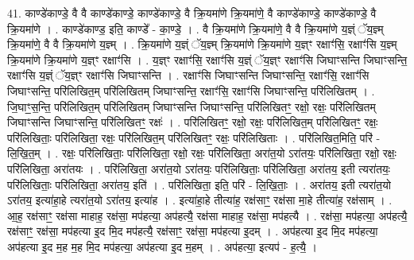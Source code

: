 \documentclass[17pt]{extarticle}
\begin{document}
41. काण्डे॑काण्डे॒ वै वै काण्डे॑काण्डे॒ काण्डे॑काण्डे॒ वै क्रि॒यमा॑णे क्रि॒यमा॑णे॒ वै काण्डे॑काण्डे॒ काण्डे॑काण्डे॒ वै क्रि॒यमा॑णे । . काण्डे॑काण्ड॒ इति॒ काण्डे᳚ - का॒ण्डे॒ । . वै क्रि॒यमा॑णे क्रि॒यमा॑णे॒ वै वै क्रि॒यमा॑णे य॒ज्ञ्ं ॅय॒ज्ञ्म् क्रि॒यमा॑णे॒ वै वै क्रि॒यमा॑णे य॒ज्ञ्म् । . क्रि॒यमा॑णे य॒ज्ञ्ं ॅय॒ज्ञ्म् क्रि॒यमा॑णे क्रि॒यमा॑णे य॒ज्ञ्ꣳ रक्षाꣳ॑सि॒ रक्षाꣳ॑सि य॒ज्ञ्म् क्रि॒यमा॑णे क्रि॒यमा॑णे य॒ज्ञ्ꣳ रक्षाꣳ॑सि । . य॒ज्ञ्ꣳ रक्षाꣳ॑सि॒ रक्षाꣳ॑सि य॒ज्ञ्ं ॅय॒ज्ञ्ꣳ रक्षाꣳ॑सि जिघाꣳसन्ति जिघाꣳसन्ति॒ रक्षाꣳ॑सि य॒ज्ञ्ं ॅय॒ज्ञ्ꣳ रक्षाꣳ॑सि जिघाꣳसन्ति । . रक्षाꣳ॑सि जिघाꣳसन्ति जिघाꣳसन्ति॒ रक्षाꣳ॑सि॒ रक्षाꣳ॑सि जिघाꣳसन्ति॒ परि॑लिखित॒म् परि॑लिखितम् जिघाꣳसन्ति॒ रक्षाꣳ॑सि॒ रक्षाꣳ॑सि जिघाꣳसन्ति॒ परि॑लिखितम् । . जि॒घाꣳ॒॒स॒न्ति॒ परि॑लिखित॒म् परि॑लिखितम् जिघाꣳसन्ति जिघाꣳसन्ति॒ परि॑लिखितꣳ॒॒ रक्षो॒ रक्षः॒ परि॑लिखितम् जिघाꣳसन्ति जिघाꣳसन्ति॒ परि॑लिखितꣳ॒॒ रक्षः॑ । . परि॑लिखितꣳ॒॒ रक्षो॒ रक्षः॒ परि॑लिखित॒म् परि॑लिखितꣳ॒॒ रक्षः॒ परि॑लिखिताः॒ परि॑लिखिता॒ रक्षः॒ परि॑लिखित॒म् परि॑लिखितꣳ॒॒ रक्षः॒ परि॑लिखिताः । . परि॑लिखित॒मिति॒ परि॑ - लि॒खि॒त॒म् । . रक्षः॒ परि॑लिखिताः॒ परि॑लिखिता॒ रक्षो॒ रक्षः॒ परि॑लिखिता॒ अरा॑त॒यो ऽरा॑तयः॒ परि॑लिखिता॒ रक्षो॒ रक्षः॒ परि॑लिखिता॒ अरा॑तयः । . परि॑लिखिता॒ अरा॑त॒यो ऽरा॑तयः॒ परि॑लिखिताः॒ परि॑लिखिता॒ अरा॑तय॒ इती त्यरा॑तयः॒ परि॑लिखिताः॒ परि॑लिखिता॒ अरा॑तय॒ इति॑ । . परि॑लिखिता॒ इति॒ परि॑ - लि॒खि॒ताः॒ । . अरा॑तय॒ इती त्यरा॑त॒यो ऽरा॑तय॒ इत्या॑हा॒हे त्यरा॑त॒यो ऽरा॑तय॒ इत्या॑ह । . इत्या॑हा॒हे तीत्या॑ह॒ रक्ष॑साꣳ॒॒ रक्ष॑सा मा॒हे तीत्या॑ह॒ रक्ष॑साम् । . आ॒ह॒ रक्ष॑साꣳ॒॒ रक्ष॑सा माहाह॒ रक्ष॑सा॒ मप॑हत्या॒ अप॑हत्यै॒ रक्ष॑सा माहाह॒ रक्ष॑सा॒ मप॑हत्यै । . रक्ष॑सा॒ मप॑हत्या॒ अप॑हत्यै॒ रक्ष॑साꣳ॒॒ रक्ष॑सा॒ मप॑हत्या इ॒द मि॒द मप॑हत्यै॒ रक्ष॑साꣳ॒॒ रक्ष॑सा॒ मप॑हत्या इ॒दम् । . अप॑हत्या इ॒द मि॒द मप॑हत्या॒ अप॑हत्या इ॒द म॒ह म॒ह मि॒द मप॑हत्या॒ अप॑हत्या इ॒द म॒हम् । . अप॑हत्या॒ इत्यप॑ - ह॒त्यै॒ । \newline
\pagebreak
{}
\end{document}
